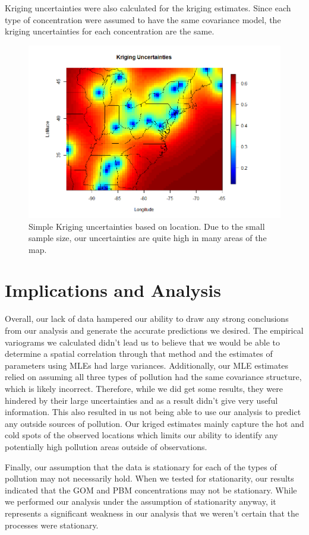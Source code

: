 \documentclass[12pt,a4]{article}
\theoremstyle{plain} %
\begin{document}
Kriging uncertainties were also calculated for the kriging estimates. Since each type of concentration were assumed to have the same covariance model, the kriging uncertainties for each concentration are the same.
\begin{figure}[H]
    \centering
    \includegraphics[width=0.7\linewidth]{krig_uncert.png}
    \caption{Simple Kriging uncertainties based on location. Due to the small sample size, our uncertainties are quite high in many areas of the map.}
\end{figure}

\section{Implications and Analysis}


Overall, our lack of data hampered our ability to draw any strong conclusions from our analysis and generate the accurate predictions we desired.  The empirical variograms we calculated didn't lead us to believe that we would be able to determine a spatial correlation through that method and the estimates of parameters using MLEs had large variances. Additionally, our MLE estimates relied on assuming all three types of pollution had the same covariance structure, which is likely incorrect. Therefore, while we did get some results, they were hindered by their large uncertainties and as a result didn't give very useful information. This also resulted in us not being able to use our analysis to predict any outside sources of pollution. Our kriged estimates mainly capture the hot and cold spots of the observed locations which limits our ability to identify any potentially high pollution areas outside of observations.

Finally, our assumption that the data is stationary for each of the types of pollution may not necessarily hold. When we tested for stationarity, our results indicated that the GOM and PBM concentrations may not be stationary. While we performed our analysis under the assumption of stationarity anyway, it represents a significant weakness in our analysis that we weren't certain that the processes were stationary.
\end{document}
